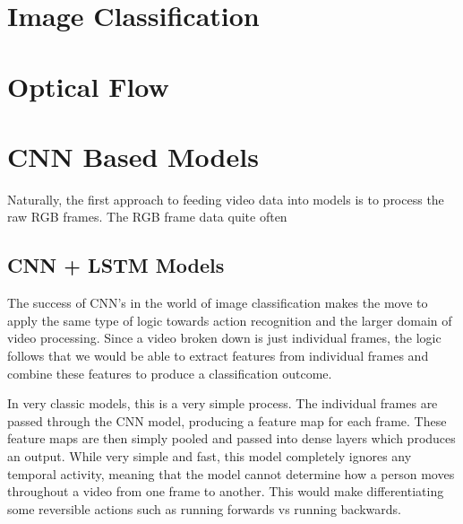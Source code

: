 \section{Image Classification}

\section{Optical Flow}

\section{CNN Based Models}

Naturally, the first approach to feeding video data into models is to process the raw RGB frames. The RGB frame data quite often 

\subsection{CNN + LSTM Models}

The success of CNN's in the world of image classification makes the move to apply the same type of logic towards action recognition and the larger domain of video processing. Since a video broken down is just individual frames, the logic follows that we would be able to extract features from individual frames and combine these features to produce a classification outcome.

In very classic models, this is a very simple process. The individual frames are passed through the CNN model, producing a feature map for each frame. These feature maps are then simply pooled and passed into dense layers which produces an output. While very simple and fast, this model completely ignores any temporal activity, meaning that the model cannot determine how a person moves throughout a video from one frame to another. This would make differentiating some reversible actions such as running forwards vs running backwards.

